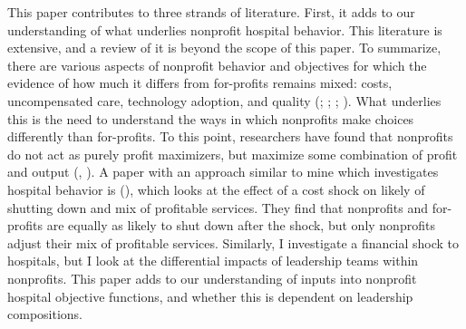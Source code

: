 \documentclass[12pt]{article}
\begin{document}
    This paper contributes to three strands of literature. First, it adds to our understanding of what underlies nonprofit hospital behavior. This literature is extensive, and a review of it is beyond the scope of this paper. To summarize, there are various aspects of nonprofit behavior and objectives for which the evidence of how much it differs from for-profits remains mixed: costs, uncompensated care, technology adoption, and quality (\cite{sloan2000not}; \cite{eggleston2008hospital}; \cite{moscelli2018effect}; \cite{moscone2020public}). What underlies this is the need to understand the ways in which nonprofits make choices differently than for-profits. To this point, researchers have found that nonprofits do not act as purely profit maximizers, but maximize some combination of profit and output (\cite{deneffe2002not}, \cite{chang2011nonprofit}). A paper with an approach similar to mine which investigates hospital behavior is \citeauthor{chang2011nonprofit} (\citeyear{chang2011nonprofit}), which looks at the effect of a cost shock on likely of shutting down and mix of profitable services. They find that nonprofits and for-profits are equally as likely to shut down after the shock, but only nonprofits adjust their mix of profitable services. Similarly, I investigate a financial shock to hospitals, but I look at the differential impacts of leadership teams within nonprofits. This paper adds to our understanding of inputs into nonprofit hospital objective functions, and whether this is dependent on leadership compositions. 
\end{document}
